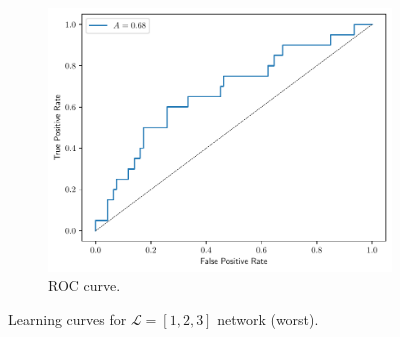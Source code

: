 \documentclass[conference]{IEEEtran}
\theoremstyle{definition}
\theoremstyle{remark}
\theoremstyle{remark}
\begin{document}
\begin{figure}
    \begin{subfigure}[b]{0.32\textwidth}
        \centering
        \includegraphics[width=\textwidth]{figs/1-2-3-0.9-roc.pdf}
        \caption{ROC curve.}
    \end{subfigure}
    \caption{Learning curves for $\mathcal{L}=[1,2,3]$ network (worst).}
    \label{fig:NN-worst}
\end{figure}
\end{document}
